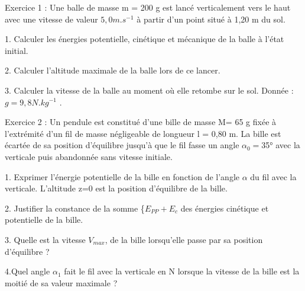 \documentclass[12pt, french]{article}
\begin{document}
\begin{center}
\end{center}


   \begin{Box2}{Exercice 1 : }
      Une balle de masse m = 200 g est lancé verticalement vers le haut avec une vitesse de valeur $5,0 m.s^{-1}$ à partir d'un point situé à 1,20 m du sol.

1. Calculer les énergies potentielle, cinétique et mécanique de la balle à l'état initial.

2. Calculer l'altitude maximale de la balle lors de ce lancer.

3. Calculer la vitesse de la balle au moment où elle retombe sur le sol.
      Donnée : $g = 9,8 N.kg^{-1}$ .
   \end{Box2}


\begin{Box2}{Exercice 2 : }
Un pendule est constitué d'une bille de masse M= 65 g fixée à l'extrémité d'un fil de masse négligeable de longueur l = 0,80 m. La bille est écartée de sa position d'équilibre jusqu'à que le fil fasse un angle $\alpha_0 = $35° avec la verticale puis abandonnée sans vitesse initiale.

1. Exprimer l'énergie potentielle de la bille en fonction de l'angle $\alpha$ du fil avec la verticale. L’altitude z=0 est la position d'équilibre de la bille.

2. Justifier la constance de la somme \{$E_{PP} + E_c$ des énergies cinétique et potentielle de la bille.

3. Quelle est la vitesse $V_{max}$, de la bille lorsqu'elle passe par sa position d'équilibre ?

4.Quel angle $\alpha_1$ fait le fil avec la verticale en N lorsque la vitesse de la bille est la moitié de sa valeur maximale ?
\end{Box2}
\end{document}
